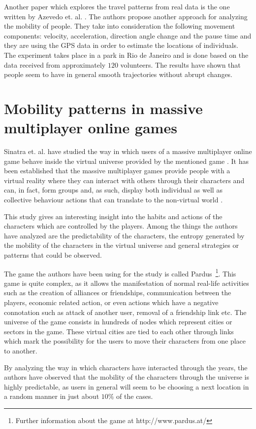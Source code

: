 Another paper which explores the travel patterns from real data is the one
written by Azevedo et. al. \cite{Azevedo09}. The authors propose another
approach for analyzing the mobility of people. They take into consideration the
following movement components: velocity, acceleration, direction angle change
and the pause time and they are using the GPS data in order to estimate the
locations of individuals. The experiment takes place in a park in Rio de Janeiro
and is done based on the data received from approximately $120$ volunteers. The
results have shown that people seem to have in general smooth trajectories without
abrupt changes.

\section{Mobility patterns in massive multiplayer online games}
Sinatra et. al. have studied the way in which users of a massive multiplayer
online game behave inside the virtual universe provided by the mentioned game
\cite{Sinatra14}. It has been established that the massive multiplayer games
provide people with a virtual reality where they can interact with others
through their characters and can, in fact, form groups and, as such, display
both individual as well as collective behaviour actions that can translate to
the non-virtual world \cite{Ball03}.

This study gives an interesting insight into the habits and actions of the
characters which are controlled by the players. Among the things the authors
have analyzed are the predictability of the characters, the entropy generated by
the mobility of the characters in the virtual universe and general strategies or
patterns that could be observed.

The game the authors have been using for the study is called
Pardus~\footnote{Further information about the game at http://www.pardus.at/}.
This game is quite complex, as it allows the manifestation of normal real-life
activities such as the creation of alliances or friendships, communication
between the players, economic related action, or even actions which have a
negative connotation such as attack of another user, removal of a friendship
link etc. The universe of the game consists in hundreds of nodes which represent
cities or sectors in the game. These virtual cities are tied to each other
through links which mark the possibility for the users to move their characters
from one place to another.

By analyzing the way in which characters have interacted through the years, the
authors have observed that the mobility of the characters through the universe
is highly predictable, as users in general will seem to be choosing a next
location in a random manner in just about $10\%$ of the cases.

